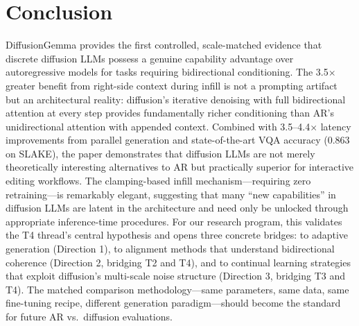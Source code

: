 \documentclass[11pt,a4paper]{article}
\begin{document}
\section{Conclusion}

DiffusionGemma provides the first controlled, scale-matched evidence that discrete diffusion LLMs possess a genuine capability advantage over autoregressive models for tasks requiring bidirectional conditioning. The 3.5$\times$ greater benefit from right-side context during infill is not a prompting artifact but an architectural reality: diffusion's iterative denoising with full bidirectional attention at every step provides fundamentally richer conditioning than AR's unidirectional attention with appended context. Combined with 3.5--4.4$\times$ latency improvements from parallel generation and state-of-the-art VQA accuracy (0.863 on SLAKE), the paper demonstrates that diffusion LLMs are not merely theoretically interesting alternatives to AR but practically superior for interactive editing workflows. The clamping-based infill mechanism---requiring zero retraining---is remarkably elegant, suggesting that many ``new capabilities'' in diffusion LLMs are latent in the architecture and need only be unlocked through appropriate inference-time procedures. For our research program, this validates the T4 thread's central hypothesis and opens three concrete bridges: to adaptive generation (Direction 1), to alignment methods that understand bidirectional coherence (Direction 2, bridging T2 and T4), and to continual learning strategies that exploit diffusion's multi-scale noise structure (Direction 3, bridging T3 and T4). The matched comparison methodology---same parameters, same data, same fine-tuning recipe, different generation paradigm---should become the standard for future AR vs.\ diffusion evaluations.
\end{document}

